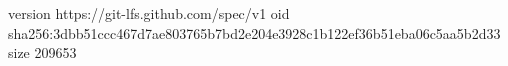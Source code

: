 version https://git-lfs.github.com/spec/v1
oid sha256:3dbb51ccc467d7ae803765b7bd2e204e3928c1b122ef36b51eba06c5aa5b2d33
size 209653
